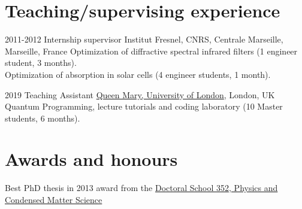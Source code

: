 \documentclass[]{cv} %
\begin{document}
\begin{entrylist}
% 


\end{entrylist}


\vspace*{-0.2cm}
\section{Teaching/supervising experience}

\begin{entrylist}
\entry
{2011-2012}
{Internship supervisor}
{{Institut Fresnel}, CNRS, Centrale Marseille, Marseille, France}
{Optimization of diffractive spectral infrared filters (1 engineer student, 3 months).\\
Optimization of absorption in solar cells (4 engineer students, 1 month).
}

\entry
{2019}
{Teaching Assistant}
{\href{http://antennas.eecs.qmul.ac.uk/}{Queen Mary, University of London}, London, UK}
{Quantum Programming, lecture tutorials and coding laboratory (10 Master students, 6 months).}


\end{entrylist}

\vspace*{-0.2cm}
\section{Awards and honours}

{Best PhD thesis in 2013 award} from the {\href{http://ed352.sciences.univmed.fr/}{Doctoral School 352, Physics and Condensed Matter Science}}
\end{document}
